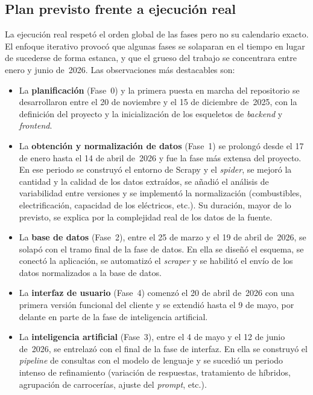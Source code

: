 \subsection{Plan previsto frente a ejecución real}
\label{sec:met-real}

La ejecución real respetó el orden global de las fases pero no su calendario
exacto. El enfoque iterativo provocó que algunas fases se solaparan en el tiempo
en lugar de sucederse de forma estanca, y que el grueso del trabajo se concentrara
entre enero y junio de~2026. Las observaciones más destacables son:

\begin{itemize}
  \item La \textbf{planificación} (Fase~0) y la primera puesta en marcha del
        repositorio se desarrollaron entre el 20 de noviembre y el 15 de
        diciembre de~2025, con la definición del proyecto y la inicialización de
        los esqueletos de \emph{backend} y \emph{frontend}.

  \item La \textbf{obtención y normalización de datos} (Fase~1) se prolongó desde
        el 17 de enero hasta el 14 de abril de~2026 y fue la fase más extensa del
        proyecto. En ese periodo se construyó el entorno de Scrapy y el
        \emph{spider}, se mejoró la cantidad y la calidad de los datos extraídos,
        se añadió el análisis de variabilidad entre versiones y se implementó la
        normalización (combustibles, electrificación, capacidad de los eléctricos,
        etc.). Su duración, mayor de lo previsto, se explica por la complejidad
        real de los datos de la fuente.

  \item La \textbf{base de datos} (Fase~2), entre el 25 de marzo y el 19 de abril
        de~2026, se solapó con el tramo final de la fase de datos. En ella se
        diseñó el esquema, se conectó la aplicación, se automatizó el
        \emph{scraper} y se habilitó el envío de los datos normalizados a la base
        de datos.

  \item La \textbf{interfaz de usuario} (Fase~4) comenzó el 20 de abril de~2026
        con una primera versión funcional del cliente y se extendió hasta el 9 de
        mayo, por delante en parte de la fase de inteligencia artificial.

  \item La \textbf{inteligencia artificial} (Fase~3), entre el 4 de mayo y el 12
        de junio de~2026, se entrelazó con el final de la fase de interfaz. En ella
        se construyó el \emph{pipeline} de consultas con el modelo de lenguaje y se
        sucedió un periodo intenso de refinamiento (variación de respuestas,
        tratamiento de híbridos, agrupación de carrocerías, ajuste del
        \emph{prompt}, etc.).


\end{itemize}
